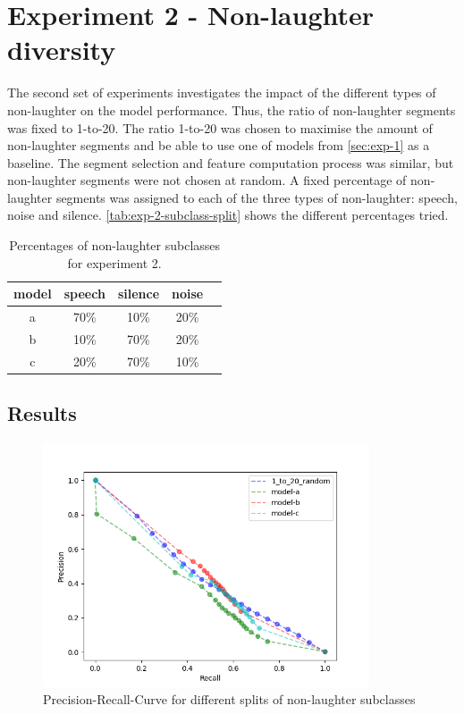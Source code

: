 \documentclass[bsc,frontabs,parskip,deptreport]{infthesis}
\begin{document}
\section{Experiment 2 - Non-laughter diversity} \label{sec:exp2}
The second set of experiments investigates the impact of the different types of non-laughter on the model performance. 
Thus, the ratio of non-laughter segments was fixed to 1-to-20. The ratio 1-to-20 was chosen to maximise the amount of non-laughter segments and be able to use one of models from \autoref{sec:exp-1} as a baseline.
The segment selection and feature computation process was similar, but non-laughter segments were not chosen at random. A fixed percentage of non-laughter segments was assigned to each of the three types of non-laughter: speech, noise and silence.
\autoref{tab:exp-2-subclass-split} shows the different percentages tried.

\begin{table}[h!]
    \centering
    \begin{tabular}{|c|c|c|c|c|}
        \hline
        model & speech & silence & noise \\
        \hline
        a &  70\% & 10\% & 20\% \\
        b &  10\%  & 70\% &  20\%\\
        c &  20\%  & 70\% & 10\% \\ 
        \hline
    \end{tabular}
    \caption{Percentages of non-laughter subclasses for experiment 2.}
    \label{tab:exp-2-subclass-split}
\end{table}

\subsection{Results}
\begin{figure}[h!]
    \centering
    \includegraphics[width = 3.8in]{imgs/prec-recall/structured/dev_compare_class_balance_dev_set.png}
    \caption{Precision-Recall-Curve for different splits of non-laughter subclasses}
    \label{fig:prec-recall-struc}
\end{figure}
\end{document}
